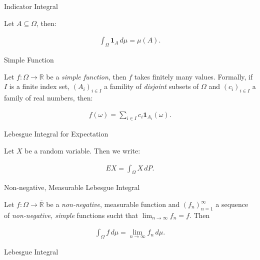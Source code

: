 \documentclass[10pt,landscape]{article}
\newcommand{\Indicator}[1]{\mathbf{1}_{#1}}
\begin{document}
\begin{multicols}{3}
\begin{definition}{}{Indicator Integral}

    Let $A \subseteq \Omega$, then:

        \begin{align*}
            \int_{\Omega} \Indicator{A} \,d\mu = \mu(A).
        \end{align*}

\end{definition}

\begin{definition}{}{Simple Function}

    Let $f: \Omega \to \mathbb{R}$ be a \emph{simple function}, then $f$ takes finitely many values. Formally, if $I$ is a finite index set, $(A_i)_{i \in I}$ a famility of \emph{disjoint} subsets of $\Omega$ and $(c_i)_{i \in I}$ a family of real numbers, then:

        \begin{align*}
            f(\omega) = \sum_{i \in I} c_i \Indicator{A_i}(\omega).
        \end{align*}

\end{definition}

\begin{definition}{}{Lebesgue Integral for Expectation}

    Let $X$ be a random variable. Then we write:

        \begin{align*}
            EX = \int_{\Omega} X \,dP.
        \end{align*}

\end{definition}

\begin{definition}{}{Non-negative, Measurable Lebesgue Integral}

    Let $f: \Omega \to \overline{\mathbb{R}}$ be a \emph{non-negative}, measurable function and $(f_n)_{n=1}^{\infty}$ a sequence of \emph{non-negative, simple} functions sucht that $\lim_{n \to \infty} f_n = f$. Then

        \begin{align*}
            \int_{\Omega} f \, d\mu = \lim_{n \to \infty} f_n \, d\mu.
        \end{align*}

\end{definition}

\begin{definition}{}{Lebesgue Integral}


\end{definition}
\end{multicols}
\end{document}
